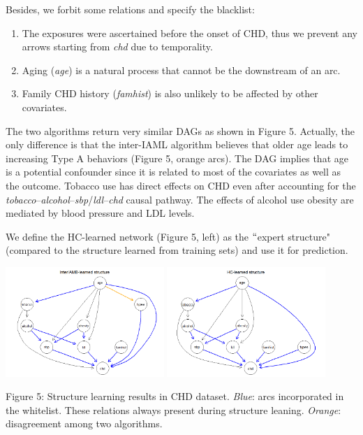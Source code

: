\documentclass{article}
\begin{document}
Besides, we forbit some relations and specify the blacklist: 
\vspace{-1.5em}
\begin{enumerate}
\setlength\itemindent{-1em}
\setlength\itemsep{0em}
	\item The exposures were ascertained before the onset of CHD, thus we prevent any arrows starting from \textit{chd }due to temporality. 
	\item Aging (\textit{age}) is a natural process that cannot be the downstream of an arc. 
	\item Family CHD history (\textit{famhist}) is also unlikely to be affected by other covariates.
\end{enumerate} \par

The two algorithms return very similar DAGs as shown in Figure 5. Actually, the only difference is that the inter-IAML algorithm believes that older age leads to increasing Type A behaviors (Figure 5, orange arcs). The DAG implies that age is a potential confounder since it is related to most of the covariates as well as the outcome. Tobacco use has direct effects on CHD even after accounting for the \textit{tobacco}–\textit{alcohol}–\textit{sbp}/\textit{ldl}–\textit{chd} causal pathway. The effects of alcohol use obesity are mediated by blood pressure and LDL levels. \par

We define the HC-learned network (Figure 5, left) as the $``$expert structure" (compared to the structure learned from training sets) and use it for prediction. \par

\begin{center}
\includegraphics[width=0.45\textwidth]{./media/image6.png}
\includegraphics[width=0.45\textwidth]{./media/image7.png}
\end{center}
\vspace{-1em}
{\fontsize{8pt}{10.8pt}\selectfont Figure 5: Structure learning results in CHD dataset. \textit{Blue}: arcs incorporated in the whitelist. These relations always present during structure leaning. \textit{Orange}: disagreement among two algorithms. \par}
\end{document}
